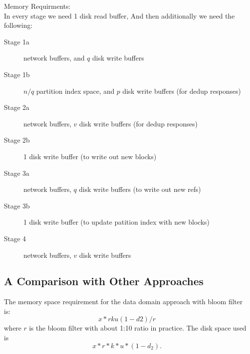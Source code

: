 Memory Requirments:\\
In every stage we need 1 disk read buffer, And then additionally we need the following:
\begin{description}
    \item[Stage 1a] network buffers, and $q$ disk write buffers
    \item[Stage 1b] $n/q$ partition index space, and $p$ disk write buffers (for dedup responses)
    \item[Stage 2a] network buffers, $v$ disk write buffers (for dedup responses)
    \item[Stage 2b] 1 disk write buffer (to write out new blocks)
    \item[Stage 3a] network buffers, $q$ disk write buffers (to write out new refs)
    \item[Stage 3b] 1 disk write buffer (to update patition index with new blocks)
    \item[Stage 4] network buffers, $v$ disk write buffers
\end{description}




\subsection{A Comparison with Other Approaches}

The memory  space requirement for the data domain approach with bloom filter is:
\[
x*r k u (1-d2)/r
\]
where $r$ is the bloom filter with about  1:10 ratio in practice.  The disk space used  is 
\[
x*r *k *u*(1-d_2).
\]


